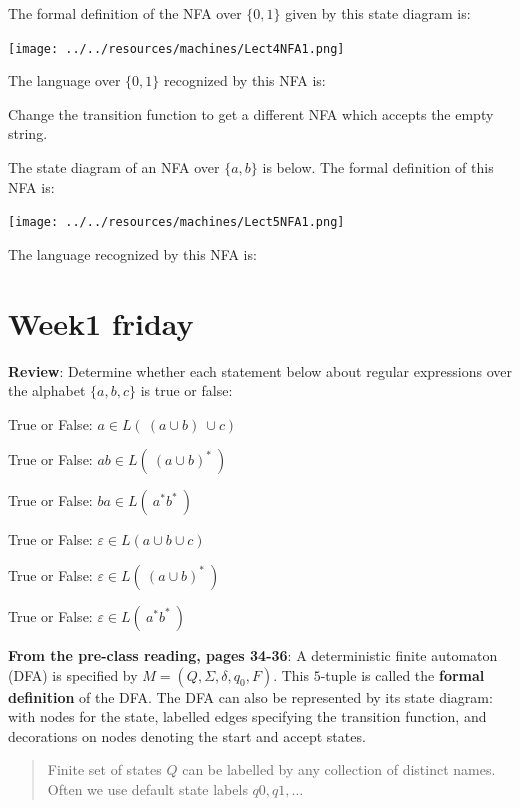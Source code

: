\documentclass[12pt, oneside]{article}
\begin{document}
The formal definition of the NFA over $\{0,1\}$ given by this state diagram is: 

\texttt{[image: ../../resources/machines/Lect4NFA1.png]}

The language over $\{0,1\}$ recognized by this NFA is:

\vspace{70pt}

Change the transition function to get a different NFA which accepts
the empty string.


\newpage

The state diagram of an NFA over $\{a,b\}$ is below.  The formal definition of this NFA is:

\vspace{-30pt}

\texttt{[image: ../../resources/machines/Lect5NFA1.png]}


\vspace{-10pt}

The language recognized by this NFA is:  \vfill
\section*{Week1 friday}


{\bf Review}: Determine whether each statement below about regular expressions
over the alphabet $\{a,b,c\}$ is true or false:
   
True or False: \qquad 
   $a  \in L(~(a \cup b )~\cup c)$

True or False: \qquad 
   $ab  \in L(~ (a \cup b)^*  ~)$
   
True or False: \qquad    
   $ba \in L( ~ a^* b^* ~)$
   
True or False: \qquad 
   $\varepsilon  \in L(a \cup b \cup c)$
   
True or False: \qquad 
   $\varepsilon  \in L(~ (a \cup b)^*  ~)$

True or False: \qquad 
   $\varepsilon \in L( ~ a^* b^* ~)$


{\bf From the pre-class reading, pages 34-36}:
A deterministic finite automaton (DFA) is specified by  $M = (Q, \Sigma, \delta, q_0, F)$.
This $5$-tuple is called the {\bf formal definition} of the DFA. The DFA can also 
be represented by its state diagram: with nodes for the state, labelled edges specifying the 
transition function, and decorations on nodes denoting the start and accept states.

\begin{quote}
Finite set of states $Q$ can be labelled by any collection of distinct names. Often
we use default state labels $q0, q1, \ldots$ 
\end{quote}
\end{document}
